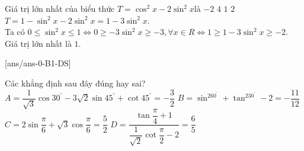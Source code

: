 \begin{ex}%
	Giá trị lớn nhất của biểu thức $ T=\cos^2x-2\sin^2x$là
	\choice
	{$-2$}
	{$ 4$}
	{\True $ 1$}
	{$ 2$}
	\loigiai
	{		$ T=1-\sin^2x-2\sin^2x$$=1-3\sin^2x$.\\
		Ta có $ 0\le{\sin^2}x\le 1$$\Leftrightarrow 0\ge-3\sin^2x\ge-3,\forall x\in R$$\Leftrightarrow 1\ge 1-3\sin^2x\ge-2$.\\
		Giá trị lớn nhất là $ 1$.}
\end{ex}

\cauds
{}[ans/ans-0-B1-DS]

\begin{ex}%
	Các khẳng định  sau đây đúng hay sai? 
	\choiceTF
	{\True $ A=\dfrac{1}{\sqrt{3}}\cos{30^{^\circ}}-3\sqrt{2}\sin{45^{^\circ}}+\cot{45^{^\circ}}=-\dfrac{3}{2}$}
	{\True $ B=\sin^260^{^\circ}+\tan^230^{^\circ}-2=-\dfrac{11}{12}$}
	{\True $ C=2\sin\dfrac{\pi}{6}+\sqrt{3}\cos\dfrac{\pi}{6}=\dfrac{5}{2}$}
	{$ D=\dfrac{\tan\dfrac{\pi}{4}+1}{\dfrac{1}{\sqrt{2}}\cot\dfrac{\pi}{2}-2}=\dfrac{6}{5}$}
\end{ex}


